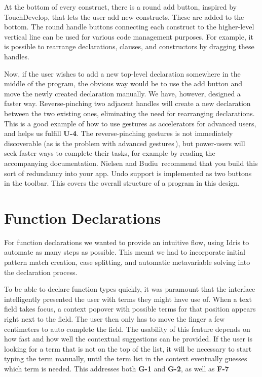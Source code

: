 At the bottom of every construct, there is a round add button, inspired by TouchDevelop, that lets the user add new constructs. These are added to the bottom. 
The round handle buttons connecting each construct to the higher-level vertical line can be used for various code management purposes. 
For example, it is possible to rearrange declarations, clauses, and constructors by dragging these handles. 

Now, if the user wishes to add a new top-level declaration somewhere in the middle of the program, the obvious way would be to use the add button and move the newly created declaration manually. We have, however, designed a faster way.
Reverse-pinching two adjacent handles will create a new declaration between the two existing ones, eliminating the need for rearranging declarations. 
This is a good example of how to use gestures as accelerators for advanced users, and helps us fulfill \textbf{U-4}.
The reverse-pinching gestures is not immediately discoverable (as is the problem with advanced gestures\,\cite[p 141]{nielsen2013mobile}), but power-users will seek faster ways to complete their tasks, for example by reading the accompanying documentation. 
Nielsen and Budiu\,\cite[p 143]{nielsen2013mobile} recommend that you build this sort of redundancy into your app. 
Undo support is implemented as two buttons in the toolbar.
This covers the overall structure of a program in this design.


\section{Function Declarations}
For function declarations we wanted to provide an intuitive flow, using Idris to automate as many steps as possible. 
This meant we had to incorporate initial pattern match creation, case splitting, and automatic metavariable solving into the declaration process.

To be able to declare function types quickly, it was paramount that the interface intelligently presented the user with terms they might have use of.
When a text field takes focus, a context popover with possible terms for that position appears right next to the field. 
The user then only has to move the finger a few centimeters to auto complete the field. 
The usability of this feature depends on how fast and how well the contextual suggestions can be provided.
If the user is looking for a term that is not on the top of the list, it will be necessary to start typing the term manually, until the term list in the context eventually guesses which term is needed. This addresses both \textbf{G-1} and \textbf{G-2}, as well as \textbf{F-7}

